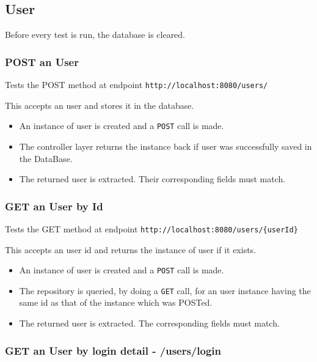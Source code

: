 \documentclass[]{article}
\providecommand{\tightlist}{%
  \setlength{\itemsep}{0pt}\setlength{\parskip}{0pt}}
\begin{document}
\hypertarget{user}{%
\subsection{User}\label{user}}

Before every test is run, the database is cleared.

\hypertarget{post-an-user}{%
\subsubsection{POST an User}\label{post-an-user}}

Tests the POST method at endpoint \texttt{http://localhost:8080/users/}

This accepts an user and stores it in the database.

\begin{itemize}
\tightlist
\item
  An instance of user is created and a \texttt{POST} call is made.
\item
  The controller layer returns the instance back if user was
  successfully saved in the DataBase.
\item
  The returned user is extracted. Their corresponding fields must match.
\end{itemize}

\hypertarget{get-an-user-by-id}{%
\subsubsection{GET an User by Id}\label{get-an-user-by-id}}

Tests the GET method at endpoint
\texttt{http://localhost:8080/users/\{userId\}}

This accepts an user id and returns the instance of user if it exists.

\begin{itemize}
\tightlist
\item
  An instance of user is created and a \texttt{POST} call is made.
\item
  The repository is queried, by doing a \texttt{GET} call, for an user
  instance having the same id as that of the instance which was POSTed.
\item
  The returned user is extracted. The corresponding fields must match.
\end{itemize}

\hypertarget{get-an-user-by-login-detail---userslogin}{%
\subsubsection{GET an User by login detail -
/users/login}\label{get-an-user-by-login-detail---userslogin}}
\end{document}
